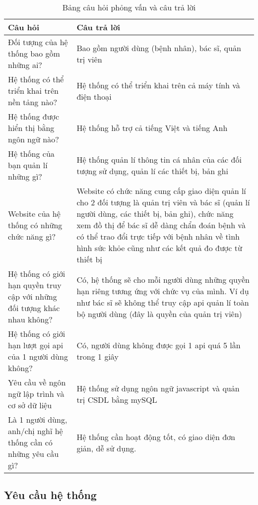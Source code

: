 \begin{table}[H]
    \centering
    \caption{Bảng câu hỏi phỏng vấn và câu trả lời}
    \begin{tabularx}{0.9\textwidth}{
    | >{\raggedright\arraybackslash}X
    | >{\raggedright\arraybackslash}X|
    }
    \hline
    \bfseries Câu hỏi                              &   \bfseries Câu trả lời \\\hline
    Đối tượng của hệ thống bao gồm những ai?       &   Bao gồm người dùng (bệnh nhân), bác sĩ, quản trị viên \\\hline
    Hệ thống có thể triển khai trên nền tảng nào?  &   Hệ thống có thể triển khai trên cả máy tính và điện thoại \\\hline
    Hệ thống được hiển thị bằng ngôn ngữ nào?      &   Hệ thống hỗ trợ cả tiếng Việt và tiếng Anh\\\hline
    Hệ thống của bạn quản lí những gì?             &   Hệ thống quản lí thông tin cá nhân của các đối tượng sử dụng, quản lí các thiết bị, bản ghi \\\hline
    Website của hệ thống có những chức năng gì?    &   Website có chức năng cung cấp giao diện quản lí cho 2 đối tượng là quản trị viên và bác sĩ (quản lí người dùng, các thiết bị, bản ghi), chức năng xem đồ thị để bác sĩ dễ dàng chẩn đoán bệnh và có thể trao đổi trực tiếp với bệnh nhân về tình hình sức khỏe cũng như các kết quả đo được từ thiết bị \\\hline
    Hệ thống có giới hạn quyền truy cập với những đối tượng khác nhau không?   &  Có, hệ thống sẽ cho mỗi người dùng những quyền hạn riêng tương ứng với chức vụ của mình. Ví dụ như bác sĩ sẽ không thể truy cập api quản lí toàn bộ người dùng (đây là quyền của quản trị viên) \\\hline
    Hệ thống có giới hạn lượt gọi api của 1 người dùng không?                  &  Có, người dùng không được gọi 1 api quá 5 lần trong 1 giây \\\hline
    Yêu cầu về ngôn ngữ lập trình và cơ sở dữ liệu &   Hệ thống sử dụng ngôn ngữ javascript và quản trị CSDL bằng mySQL \\\hline
    Là 1 người dùng, anh/chị nghĩ hệ thống cần có những yêu cầu gì?            &  Hệ thống cần hoạt động tốt, có giao diện đơn giản, dễ sử dụng. \\\hline
    \end{tabularx}
\end{table}

\subsection{Yêu cầu hệ thống}
